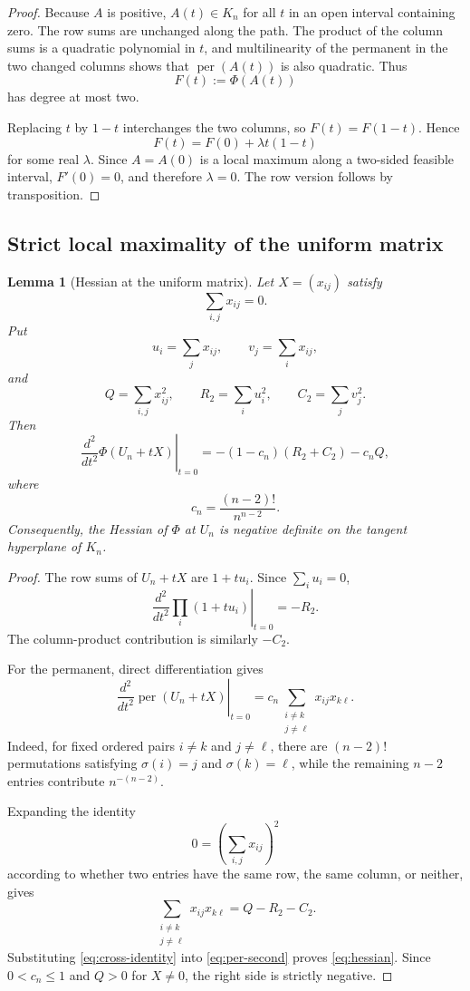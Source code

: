 \documentclass[11pt,a4paper]{article}
\numberwithin{equation}{section}
\newtheorem{lemma}[theorem]{Lemma}
\theoremstyle{definition}
\newcommand{\per}{\operatorname{per}}
\newcommand{\1}{\mathbf{1}}
\begin{document}
\begin{proof}
Because $A$ is positive, $A(t)\in K_n$ for all $t$ in an open interval containing zero.  The row sums are unchanged along the path.  The product of the column sums is a quadratic polynomial in $t$, and multilinearity of the permanent in the two changed columns shows that $\per(A(t))$ is also quadratic.  Thus
\[
 F(t):=\Phi(A(t))
\]
has degree at most two.

Replacing $t$ by $1-t$ interchanges the two columns, so $F(t)=F(1-t)$.  Hence
\[
 F(t)=F(0)+\lambda t(1-t)
\]
for some real $\lambda$.  Since $A=A(0)$ is a local maximum along a two-sided feasible interval, $F'(0)=0$, and therefore $\lambda=0$.  The row version follows by transposition.
\end{proof}

\subsection{Strict local maximality of the uniform matrix}

\begin{lemma}[Hessian at the uniform matrix]\label{lem:hessian}
Let $X=(x_{ij})$ satisfy
\[
 \sum_{i,j}x_{ij}=0.
\]
Put
\[
 u_i=\sum_jx_{ij},
 \qquad
 v_j=\sum_ix_{ij},
\]
and
\[
 Q=\sum_{i,j}x_{ij}^2,
 \qquad
 R_2=\sum_i u_i^2,
 \qquad
 C_2=\sum_jv_j^2.
\]
Then
\begin{equation}\label{eq:hessian}
 \left.\frac{d^2}{dt^2}\Phi(U_n+tX)\right|_{t=0}
 =-(1-c_n)(R_2+C_2)-c_nQ,
\end{equation}
where
\[
 c_n=\frac{(n-2)!}{n^{n-2}}.
\]
Consequently, the Hessian of $\Phi$ at $U_n$ is negative definite on the tangent hyperplane of $K_n$.
\end{lemma}

\begin{proof}
The row sums of $U_n+tX$ are $1+tu_i$.  Since $\sum_i u_i=0$,
\[
 \left.\frac{d^2}{dt^2}\prod_i(1+tu_i)\right|_{t=0}
 =-R_2.
\]
The column-product contribution is similarly $-C_2$.

For the permanent, direct differentiation gives
\begin{equation}\label{eq:per-second}
 \left.\frac{d^2}{dt^2}\per(U_n+tX)\right|_{t=0}
 =c_n\sum_{\substack{i\ne k\\j\ne\ell}}x_{ij}x_{k\ell}.
\end{equation}
Indeed, for fixed ordered pairs $i\ne k$ and $j\ne\ell$, there are $(n-2)!$ permutations satisfying $\sigma(i)=j$ and $\sigma(k)=\ell$, while the remaining $n-2$ entries contribute $n^{-(n-2)}$.

Expanding the identity
\[
 0=\left(\sum_{i,j}x_{ij}\right)^2
\]
according to whether two entries have the same row, the same column, or neither, gives
\begin{equation}\label{eq:cross-identity}
 \sum_{\substack{i\ne k\\j\ne\ell}}x_{ij}x_{k\ell}
 =Q-R_2-C_2.
\end{equation}
Substituting \eqref{eq:cross-identity} into \eqref{eq:per-second} proves \eqref{eq:hessian}.  Since $0<c_n\le1$ and $Q>0$ for $X\ne0$, the right side is strictly negative.
\end{proof}
\end{document}

